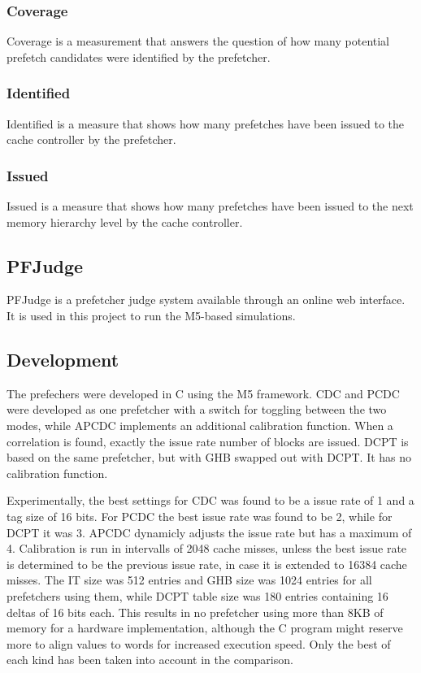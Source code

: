 \documentclass[a4paper]{IEEEtran}
\begin{document}
\subsubsection{Coverage}
Coverage is a measurement that answers the question of how many potential prefetch candidates were identified by the prefetcher.

\subsubsection{Identified}
Identified is a measure that shows how many prefetches have been issued to the cache controller by the prefetcher.

\subsubsection{Issued}
Issued is a measure that shows how many prefetches have been issued to the next memory hierarchy level by the cache controller.

\subsection{PFJudge}

PFJudge is a prefetcher judge system available through an online web interface.
It is used in this project to run the M5-based simulations.

\subsection{Development}

The prefechers were developed in C using the M5 framework.
CDC and PCDC were developed as one prefetcher with a switch for toggling between the two modes, while APCDC implements an additional calibration function.
When a correlation is found, exactly the issue rate number of blocks are issued.
DCPT is based on the same prefetcher, but with GHB swapped out with DCPT.
It has no calibration function.

Experimentally, the best settings for CDC was found to be a issue rate of 1 and a tag size of 16 bits.
For PCDC the best issue rate was found to be 2, while for DCPT it was 3.
APCDC dynamicly adjusts the issue rate but has a maximum of 4.
Calibration is run in intervalls of 2048 cache misses, unless the best issue rate is determined to be the previous issue rate, in case it is extended to 16384 cache misses.
The IT size was 512 entries and GHB size was 1024 entries for all prefetchers using them, while DCPT table size was 180 entries containing 16 deltas of 16 bits each.
This results in no prefetcher using more than 8KB of memory for a hardware implementation, although the C program might reserve more to align values to words for increased execution speed.
Only the best of each kind has been taken into account in the comparison.
\end{document}
